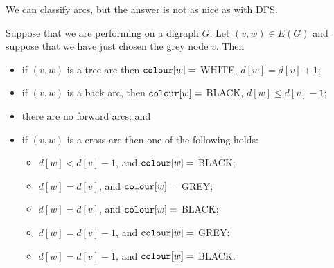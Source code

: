 
We can classify arcs, but the answer is not as nice as with DFS.

\begin{Theorem}
\label{thm:BFS-arcclass}
Suppose that we are performing  on a digraph $G$. Let $(v,
w)\in E(G)$ and suppose that we have just chosen the grey node $v$. 
Then
\begin{itemize}
\item if $(v, w)$ is a tree arc then $\colour[w] = $ WHITE, $d[w] = d[v] + 1$;
\item if $(v, w)$ is a back arc, then $\colour[w] = $ BLACK, $d[w] \leq d[v] - 1$;  
\item there are no forward arcs; and
\item if $(v, w)$ is a cross arc then one of the following holds:
	\begin{itemize}
		\item $d[w] < d[v] - 1$, and $\colour[w] = $ BLACK;
		\item $d[w] = d[v]$, and $\colour[w] = $ GREY;
		\item $d[w] = d[v]$, and $\colour[w] = $ BLACK;
		\item $d[w] = d[v] - 1$, and $\colour[w] = $ GREY;
		\item $d[w] = d[v] - 1$, and $\colour[w] = $ BLACK.
	\end{itemize}
\end{itemize}
\end{Theorem}

